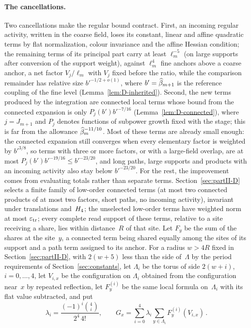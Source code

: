\paragraph{The cancellations.}
Two cancellations make the regular bound contract. First, an incoming regular activity, written in the coarse field, loses its constant, linear and affine quadratic terms by flat normalization, colour invariance and the affine Hessian condition; the remaining terms of its principal part carry at least $\ell_m^{-5}$ (on large supports after conversion of the support weight), against $\ell_m^4$ fine anchors above a coarse anchor, a net factor $V_j/\ell_m$ with $V_j$ fixed before the ratio, while the comparison remainder has relative size $b'^{-1/2+o(1)}$, where $b'=\widehat{\beta}_{m+1}$ is the reference coupling of the fine level (Lemma~\ref{lem:D-inherited}). Second, the new terms produced by the integration are connected local terms whose bound from the connected expansion is only $P_j(b')b'^{-7/16}$ (Lemma~\ref{lem:D-connected}), where $j=J_{m+1}$ and $P_j$ denotes functions of subpower growth fixed with the stage; this is far from the allowance $\widehat{\beta}_m^{-11/10}$. Most of these terms are already small enough: the connected expansion still converges when every elementary factor is weighted by $b'^{3/8}$, so terms with three or more factors, or with a large-field overlap, are at most $P_j(b')b'^{-19/16}\le b'^{-23/20}$, and long paths, large supports and products with an incoming activity also stay below $b'^{-23/20}$. For the rest, the improvement comes from evaluating totals rather than separate terms. Section~\ref{sec:partII-D} selects a finite family of low-order connected terms (at most two connected products of at most two factors, short paths, no incoming activity), invariant under translations and~$H_4$; the unselected low-order terms have weighted norm at most $\varepsilon_{\rm tr}$; every complete read support of these terms, relative to a site receiving a share, lies within distance~$R$ of that site. Let $F_y$ be the sum of the shares at the site~$y$, a connected term being shared equally among the sites of its support and a path term assigned to its anchor. For a radius $w>4R$ fixed in Section~\ref{sec:partII-D}, with $2(w+5)$ less than the side of~$\Lambda$ by the period requirements of Section~\ref{sec:constants}, let $\Lambda_i$ be the torus of side $2(w+i)$, $i=0,\ldots,4$, let $V_{i,x}$ be the configuration on $\Lambda_i$ obtained from the configuration near~$x$ by repeated reflection, let $F^{(i)}_y$ be the same local formula on~$\Lambda_i$ with its flat value subtracted, and put
\begin{equation}\label{eq:five-torus}
\lambda_i=\frac{(-1)^i\binom4i}{2^4\,4!},\qquad
G_x=\sum_{i=0}^4\lambda_i\sum_{y\in\Lambda_i}F^{(i)}_y(V_{i,x})\,.
\end{equation}

